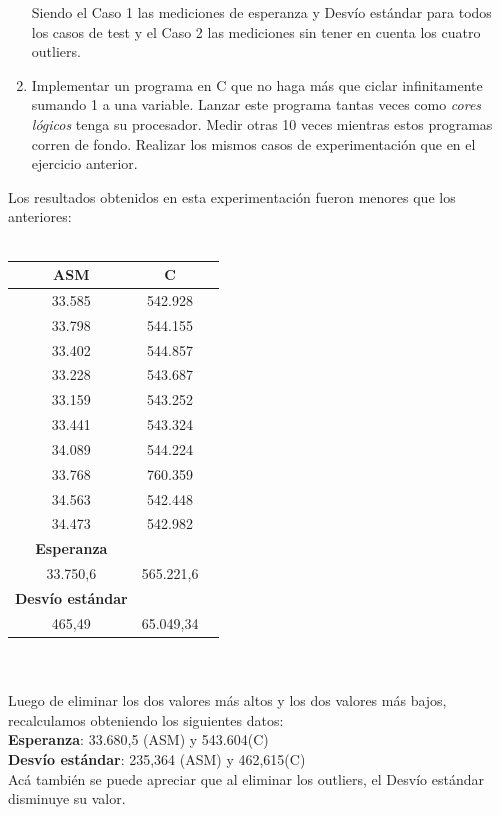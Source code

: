 \begin{enumerate}
\indent Siendo el Caso 1 las mediciones de esperanza y Desvío est\'andar para todos los casos de test y el Caso 2 las mediciones sin tener en cuenta los cuatro outliers.\\

\bigskip
    \item Implementar un programa en C que no haga más que ciclar infinitamente sumando 1 a una variable. Lanzar este programa tantas veces como \emph{cores lógicos} tenga su procesador. Medir otras 10 veces mientras estos programas corren de fondo. Realizar los mismos casos de experimentaci\'on que en el ejercicio anterior.\\
\end{enumerate}
Los resultados obtenidos en esta experimentaci\'on fueron menores que los anteriores: \\
\\       
        \begin{tabular}[c]{|c|c|c|}
	\hline
		\textbf{ASM} & \textbf{C}\\
		\hline
33.585 &	542.928 \\
\hline
33.798 &	544.155 \\
\hline
33.402 &	544.857 \\
\hline
33.228 &	543.687 \\
\hline
33.159 &	543.252 \\
\hline
33.441 &	543.324 \\
\hline
34.089 &	544.224 \\ 
\hline
33.768 &	760.359 \\ 
\hline
34.563 &	542.448 \\
\hline
34.473 &	542.982 \\
\hline
		\textbf{Esperanza}	\\
		\hline
33.750,6 & 565.221,6	\\		
		\hline
		\textbf{Desvío est\'andar}	\\
		\hline
465,49 & 65.049,34\\
		\hline
	\end{tabular}\\\\
	Luego de eliminar los dos valores m\'as altos y los dos valores m\'as bajos, recalculamos obteniendo los siguientes datos: \\
	\textbf{Esperanza}: 33.680,5 (ASM) y 543.604(C)\\
	\textbf{Desvío est\'andar}:	235,364 (ASM) y 462,615(C)\\
	Ac\'a tambi\'en se puede apreciar que al eliminar los outliers, el Desvío est\'andar disminuye su valor. \\

